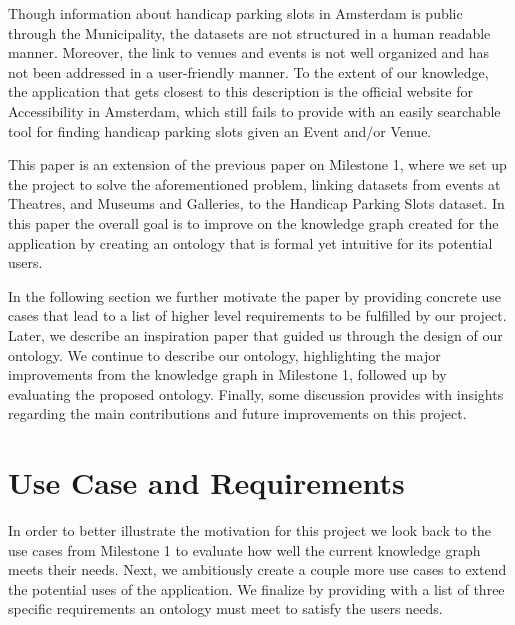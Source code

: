\documentclass[runningheads,a4paper]{../../StyleFiles/llncs}
\begin{document}
Though information about handicap parking slots in Amsterdam is public through the Municipality, the datasets are not structured in a human readable manner. Moreover, the link to venues and events is not well organized and has not been addressed in a user-friendly manner. To the extent of our knowledge, the application that gets closest to this description is the official website for Accessibility in Amsterdam, which still fails to provide with an easily searchable tool for finding handicap parking slots given an Event and/or Venue.

This paper is an extension of the previous paper on Milestone 1, where we set up the project to solve the aforementioned problem, linking datasets from events at Theatres, and Museums and Galleries, to the Handicap Parking Slots dataset. In this paper the overall goal is to improve on the knowledge graph created for the application by creating an ontology that is formal yet intuitive for its potential users.

In the following section we further motivate the paper by providing concrete use cases that lead to a list of higher level requirements to be fulfilled by our project. Later, we describe an inspiration paper that guided us through the design of our ontology. We continue to describe our ontology, highlighting the major improvements from the knowledge graph in Milestone 1, followed up by evaluating the proposed ontology. Finally, some discussion provides with insights regarding the main contributions and future improvements on this project.

\section{Use Case and Requirements}
In order to better illustrate the motivation for this project we look back to the use cases from Milestone 1 to evaluate how well the current knowledge graph meets their needs. Next, we ambitiously create a couple more use cases to extend the potential uses of the application. We finalize by providing with a list of three specific requirements an ontology must meet to satisfy the users needs.
\end{document}
